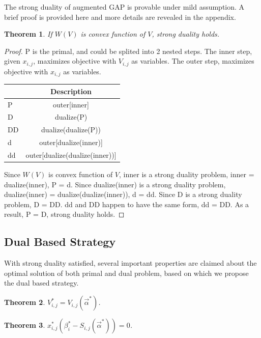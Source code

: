 \documentclass{article}
\newtheorem{theorem}{Theorem}[section]
\theoremstyle{definition}
\newcommand{\sx}{x_{i,j}}
\newcommand{\sV}{V_{i,j}}
\newcommand{\sbeta}{\beta_i}
\newcommand{\sS}{S_{i,j}}
\newcommand{\valpha}{\vec{\alpha}}
\begin{document}
\begin{CJK}{UTF8}{gbsn}
The strong duality of augmented GAP is provable under mild assumption.
A brief proof is provided here and more details are revealed in the appendix.

\begin{theorem}
If $W(V)$ is convex function of $V$, strong duality holds.
\end{theorem}

\begin{proof}
P is the primal, and could be splited into 2 nested steps.
The inner step, given $\sx$, maximizes objective with $\sV$ as variables.
The outer step, maximizes objective with $\sx$ as variables.

\begin{center}
\begin{tabular}{|l|c|}
\hline
\quad  & Description \\
\hline
P      & outer[inner] \\
\hline
D      & dualize(P) \\
\hline
DD     & dualize(dualize(P)) \\
\hline
d      & outer[dualize(inner)] \\
\hline
dd     & outer[dualize(dualize(inner))] \\
\hline
\end{tabular}
\end{center}

Since $W(V)$ is convex function of $V$, inner is a strong duality problem, inner = dualize(inner), P = d.
Since dualize(inner) is a strong duality problem, dualize(inner) = dualize(dualize(inner)), d = dd.
Since D is a strong duality problem, D = DD.
dd and DD happen to have the same form, dd = DD.
As a result, P = D, strong duality holds.
\end{proof}

\subsection{Dual Based Strategy}

With strong duality satisfied, several important properties are claimed about the optimal solution of both primal and dual problem,
    based on which we propose the dual based strategy.

\begin{theorem}
$\sV^* = \sV(\valpha^*)$.
\end{theorem}

\begin{theorem}
$\sx^*(\sbeta^* - \sS(\valpha^*)) = 0$.
\end{theorem}


\end{CJK}
\end{document}
